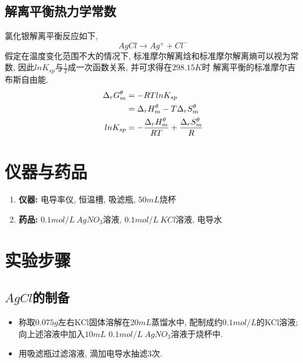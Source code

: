 \documentclass[a4paper]{article}
\begin{document}
\subsection{解离平衡热力学常数}
氯化银解离平衡反应如下, 
\begin{equation}
	AgCl \to Ag^{+} + Cl^{-}
\end{equation}
假定在温度变化范围不大的情况下, 标准摩尔解离焓和标准摩尔解离熵可以视为常数, 
因此$lnK_{sp}$与$\frac{1}{T}$成一次函数关系, 并可求得在$298.15K$时
解离平衡的标准摩尔吉布斯自由能.
\begin{equation}
	\centering
	\begin{aligned}
		\Delta_{r}G_{m}^{\theta} &= -RTlnK_{sp}\\
		&=\Delta_{r}H_{m}^{\theta} - T\Delta_{r}S_{m}^{\theta}\\
		lnK_{sp} &= -\frac{\Delta_{r}H_{m}^{\theta}}{RT} + \frac{\Delta_{r}S_{m}^{\theta}}{R}\\
	\end{aligned}
\end{equation}
\section{仪器与药品}
\begin{enumerate}
    \item \textbf{仪器:} 电导率仪, 恒温槽, 吸滤瓶, $50mL$烧杯
    \item \textbf{药品:} $0.1mol/L~AgNO_{3}$溶液, $0.1mol/L~KCl$溶液, 电导水
\end{enumerate}
\section{实验步骤}
\subsection{$AgCl$的制备}
\begin{itemize}
	\item 称取$0.075g$左右KCl固体溶解在$20mL$蒸馏水中, 配制成约$0.1mol/L$的KCl溶液;
	向上述溶液中加入$10mL$ $0.1mol/L~AgNO_{3}$溶液于烧杯中.
	\item 用吸滤瓶过滤溶液, 滴加电导水抽滤3次. 
\end{itemize}
\end{document}
